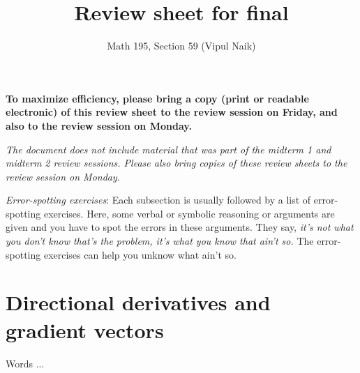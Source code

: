 \documentclass[10pt]{amsart}
\title{Review sheet for final}
\author{Math 195, Section 59 (Vipul Naik)}
\begin{document}
\maketitle

{\bf To maximize efficiency, please bring a copy (print or readable
electronic) of this review sheet to the review session on Friday, and
also to the review session on Monday.}

{\em The document does not include material that was part of the
midterm 1 and midterm 2 review sessions. Please also bring copies of
these review sheets to the review session on Monday}.

{\em Error-spotting exercises}: Each subsection is usually followed by
a list of error-spotting exercises. Here, some verbal or symbolic
reasoning or arguments are given and you have to spot the errors in
these arguments. They say, {\em it's not what you don't know that's
the problem, it's what you know that ain't so.} The error-spotting
exercises can help you unknow what ain't so.

\section{Directional derivatives and gradient vectors}

Words ...
\end{document}
